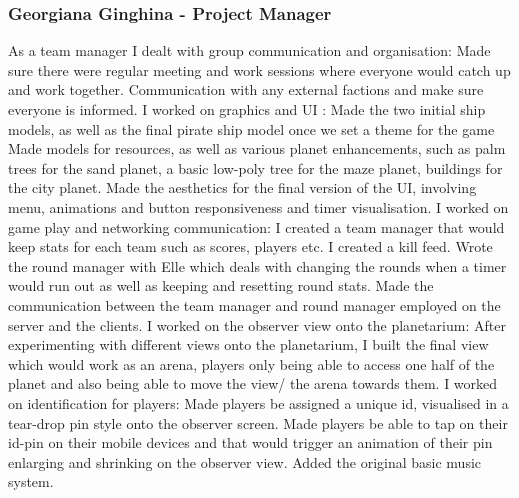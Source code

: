 \documentclass[11pt,a4paper]{article}
\begin{document}
        \subsubsection{Georgiana Ginghina - Project Manager }
        As a team manager I dealt with group communication and organisation:
        Made sure there were regular meeting and work sessions where everyone would catch up and work together.
        Communication with any external factions and make sure everyone is informed.
        I worked on graphics and UI :
        Made the two initial ship models, as well as the final pirate ship model once we set a theme for the game
        Made models for resources, as well as various planet enhancements, such as palm trees for the sand planet, a basic low-poly tree for the maze planet, buildings for the city planet.
        Made the aesthetics for the final version of the UI, involving menu, animations and button responsiveness and timer visualisation. 
        I worked on game play and networking communication:
        I created a team manager that would keep stats for each team such as scores, players etc.
        I created a kill feed.
        Wrote the round manager with Elle which deals with changing the rounds when a timer would run out as well as keeping and resetting round stats.
        Made the communication between the team manager and round manager employed on the server and the clients.
        I worked on the observer view onto the planetarium:
        After experimenting with different views onto the planetarium, I built the final view which would work as an arena, players only being able to access one half of the planet and also being able to move the view/ the arena towards them.
        I worked on identification for players:
        Made players be assigned a unique id, visualised in a tear-drop pin style onto the observer screen.
        Made players be able to tap on their id-pin on their mobile devices and that would trigger an animation of their pin enlarging and shrinking on the observer view.
        Added the original basic music system.
\end{document}
